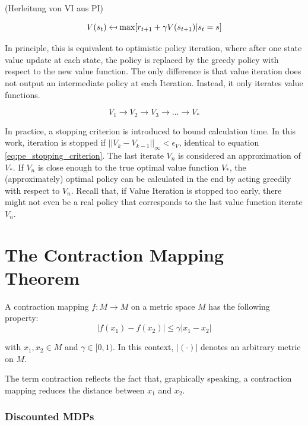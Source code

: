 (Herleitung von VI aus PI)

\begin{equation}
V(s_t) \mathrel{\reflectbox{\ensuremath{\mapsto}}} 
\max[r_{t+1}+\gamma V(s_{t+1})|s_t=s]
\label{eq:value_iteration_update}
\end{equation}

In principle, this is equivalent to optimistic policy iteration, where after one state value update at each state, the policy is replaced by the greedy policy with respect to the new value function. The only difference is that value iteration does not output an intermediate policy at each Iteration. Instead, it only iterates value functions. 

\begin{equation*}
V_1 \longrightarrow V_2 \longrightarrow V_3 \longrightarrow ... \longrightarrow  V_*
\label{eq:vi_scheme}
\end{equation*}

In practice, a stopping criterion is introduced to bound calculation time. In this work, iteration is stopped if $||V_{k}-V_{k-1}||_\infty<\epsilon_V$, identical to equation \ref{eq:pe_stopping_criterion}. The last iterate $V_n$ is considered an approximation of $V_*$. If $V_n$ is close enough to the true optimal value function $V_*$, the (approximately) optimal policy can be calculated in the end by acting greedily with respect to $V_n$. Recall that, if Value Iteration is stopped too early, there might not even be a real policy that corresponds to the last value function iterate $V_n$.

\section{The Contraction Mapping Theorem}
\label{sec:contraction_mappings}
A contraction mapping $f: M \to M$ on a metric space $M$ has the following property:
\begin{equation}
|f(x_1)-f(x_2)| \leq \gamma |x_1-x_2|
\end{equation}

with $x_1,x_2 \in M$ and $\gamma \in [0,1)$. In this context,  $|(\cdot)|$ denotes an arbitrary metric on $M$.

The term contraction reflects the fact that, graphically speaking, a contraction mapping reduces the distance between $x_1$ and $x_2$.

\subsubsection{Discounted MDPs}

